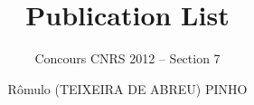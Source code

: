 \documentclass{article}
\title{Publication List}
\author{Concours CNRS 2012 -- Section 7}
\date{R\^omulo (TEIXEIRA DE ABREU) PINHO}
\begin{document}
\maketitle

%

\renewcommand{\refname}{Journal papers}
\begin{bibunit}[unsrt]
\nocite{Pinho:Trachea7}
\nocite{Pinho:Trachea4}
\putbib[mybib]
\end{bibunit}

\renewcommand{\refname}{Book chapters}
\begin{bibunit}[unsrt]
\nocite{Pinho:Trachea5}
\putbib[mybib]
\end{bibunit}

\renewcommand{\refname}{Conference proceedings (full paper)}
\begin{bibunit}[unsrt]
\nocite{DELM-11}
\nocite{PINH-11}
\nocite{RIT-11b}
\nocite{Pinho:Trachea6}
\nocite{Pinho:Airways2}
\nocite{Pinho:Trachea3}
\nocite{Pinho:Trachea2}
\nocite{Pinho:Cache1}
\nocite{Pinho:Trachea1}
\nocite{Pinho:Airways1}
\putbib[mybib]
\end{bibunit}

\renewcommand{\refname}{Conference proceedings (abstract)}
\begin{bibunit}[unsrt]
\nocite{Bernat:Clavicle}
\nocite{Huysmans:Clavicle}
\nocite{Pinho:Trachea8}
\putbib[mybib]
\end{bibunit}
\end{document}
